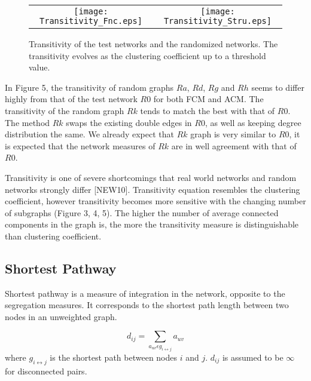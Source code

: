 \documentclass[12pt]{article}
\begin{document}
\begin{figure}[htp]

  \centering

    \begin{tabular}{cc}


    \texttt{[image: Transitivity\_Fnc.eps]} &

    \texttt{[image: Transitivity\_Stru.eps]}\\

  \end{tabular}

 \label{figur}\caption{Transitivity of the test networks and the randomized networks. The transitivity evolves as the clustering coefficient up to a threshold value. }

\end{figure}

In Figure 5, the transitivity of random graphs $Ra$, $Rd$, $Rg$ and $Rh$ seems to differ highly from that of the test network $R0$ for both FCM and ACM. The transitivity of the random graph $Rk$ tends to match the best with that of $R0$. The method $Rk$ swaps the existing double edges in $R0$, as well as keeping degree distribution the same. We already expect that $Rk$ graph is very similar to $R0$, it is expected that the network measures of $Rk$ are in well agreement with that of $R0$.

Transitivity is one of severe shortcomings that real world networks and random networks strongly differ [NEW10]. Transitivity equation resembles the clustering coefficient, however transitivity becomes more sensitive with the changing number of subgraphs (Figure 3, 4, 5). The higher the number of average connected components in the graph is, the more the transitivity measure is distinguishable than clustering coefficient. 
   
\newpage
\subsection{Shortest Pathway}
Shortest pathway is a measure of integration in the network, opposite to the segregation measures. It corresponds to the shortest path length between two nodes in an unweighted graph.  

\begin{equation}
d_{ij} = \sum\limits_{a_{uv} \epsilon g_{i\leftrightarrow j} } a_{uv}
\end{equation}
where $g_{i\leftrightarrow j}$ is the shortest path between nodes $i$ and $j$. $d_{ij}$ is assumed to be $\infty$ for disconnected pairs.
\end{document}
